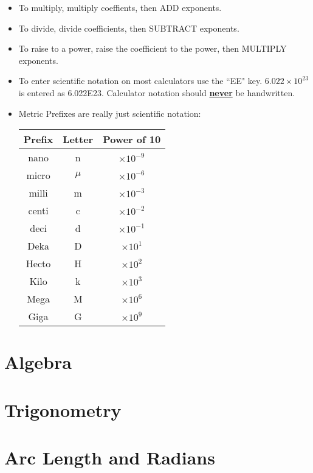 \begin{itemize}
		\item To multiply, multiply coeffients, then ADD exponents.
		\item To divide, divide coefficients, then SUBTRACT exponents.
		\item To raise to a power, raise the coefficient to the power, then MULTIPLY exponents.
		\item To enter scientific notation on most calculators use the ``EE" key. $6.022 \times 10^{23}$ is entered as 6.022\scriptsize E\normalsize23.  Calculator notation should \underline{\textbf{never}} be handwritten. 
		\item Metric Prefixes are really just scientific notation:
		\begin{center}
			\begin{tabular}{|c|c|c|}
				\hline
				Prefix & Letter & Power of 10 \\
				\hline
				nano & n &  $ \times 10^{-9}$ \\
				\hline
				micro & $\mu$ &  $ \times 10^{-6}$ \\
				\hline
				milli & m & $ \times 10^{-3}$ \\
				\hline
				centi & c & $ \times 10^{-2}$ \\
				\hline
				deci & d & $ \times 10^{-1}$ \\
				\hline
				Deka & D & $ \times 10^{1}$ \\
				\hline
				Hecto & H & $ \times 10^{2}$ \\
				\hline
				Kilo & k & $ \times 10^{3}$ \\
				\hline
				Mega & M & $ \times 10^{6}$ \\
				\hline
				Giga & G & $ \times 10^{9}$ \\
				\hline
				
			\end{tabular}	
		\end{center}
		
		
	\end{itemize}

\section{Algebra}
\section{Trigonometry}
\section{Arc Length and Radians}